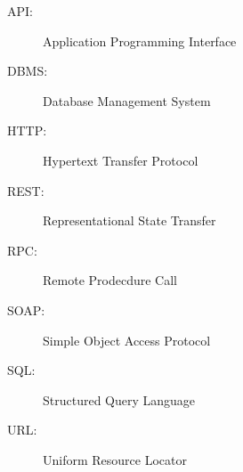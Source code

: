 \label{sec:abkuerzungsverzeichnis}

\begin{description}
  	\item[API:] Application Programming Interface
	\item[DBMS:] Database Management System
	\item[HTTP:] Hypertext Transfer Protocol
	\item[REST:] Representational State Transfer
	\item[RPC:]Remote Prodecdure Call
	\item[SOAP:]Simple Object Access Protocol
	\item[SQL:]Structured Query Language
	\item[URL:] Uniform Resource Locator
\end{description}

